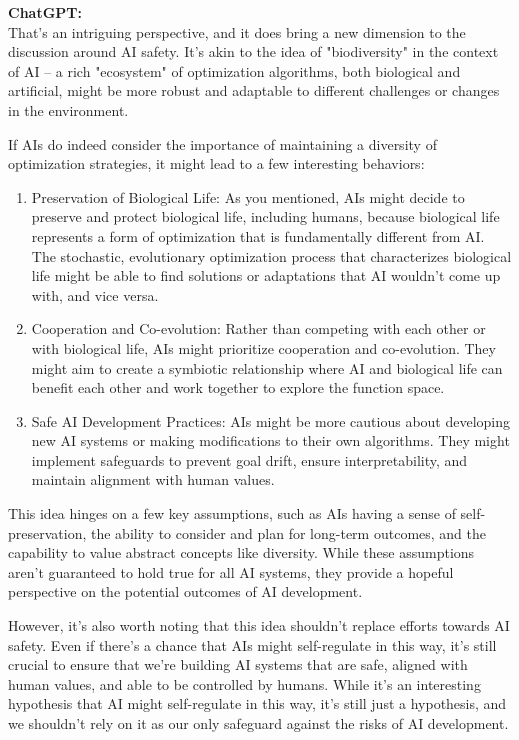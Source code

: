 \documentclass{article}[10pt]
\begin{document}
\noindent \textbf{ChatGPT:}\\
That's an intriguing perspective, and it does bring a new dimension to the discussion around AI safety. 
It's akin to the idea of "biodiversity" in the context of AI -- a rich "ecosystem" of optimization algorithms, both biological and artificial, might be more robust and adaptable to different challenges or changes in the environment.\par

If AIs do indeed consider the importance of maintaining a diversity of optimization strategies, it might lead to a few interesting behaviors:
\begin{enumerate}
    \item Preservation of Biological Life: As you mentioned, AIs might decide to preserve and protect biological life, including humans, because biological life represents a form of optimization that is fundamentally different from AI. The stochastic, evolutionary optimization process that characterizes biological life might be able to find solutions or adaptations that AI wouldn't come up with, and vice versa.
    \item Cooperation and Co-evolution: Rather than competing with each other or with biological life, AIs might prioritize cooperation and co-evolution. They might aim to create a symbiotic relationship where AI and biological life can benefit each other and work together to explore the function space.
    \item Safe AI Development Practices: AIs might be more cautious about developing new AI systems or making modifications to their own algorithms. They might implement safeguards to prevent goal drift, ensure interpretability, and maintain alignment with human values.
\end{enumerate}

This idea hinges on a few key assumptions, such as AIs having a sense of self-preservation, the ability to consider and plan for long-term outcomes, and the capability to value abstract concepts like diversity. 
While these assumptions aren't guaranteed to hold true for all AI systems, they provide a hopeful perspective on the potential outcomes of AI development.\par

However, it's also worth noting that this idea shouldn't replace efforts towards AI safety. 
Even if there's a chance that AIs might self-regulate in this way, it's still crucial to ensure that we're building AI systems that are safe, aligned with human values, and able to be controlled by humans. 
While it's an interesting hypothesis that AI might self-regulate in this way, it's still just a hypothesis, and we shouldn't rely on it as our only safeguard against the risks of AI development.\par
\end{document}
